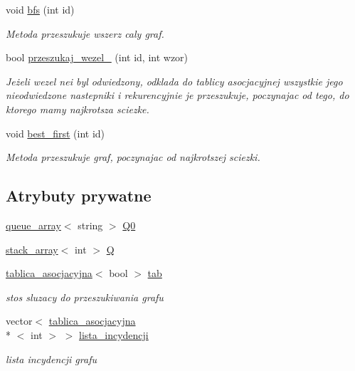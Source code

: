 \begin{DoxyCompactItemize}
void \hyperlink{classgraf_a51bb320791ada3c7700fa90477b508f4}{bfs} (int id)
\begin{DoxyCompactList}\small\item\em Metoda przeszukuje wszerz caly graf. \end{DoxyCompactList}\item 
bool \hyperlink{classgraf_abf0a6bb0cfd8ef55868981bb91881de3}{przeszukaj\-\_\-wezel\-\_} (int id, int wzor)
\begin{DoxyCompactList}\small\item\em Jeżeli wezel nei byl odwiedzony, odklada do tablicy asocjacyjnej wszystkie jego nieodwiedzone nastepniki i rekurencyjnie je przeszukuje, poczynajac od tego, do ktorego mamy najkrotsza sciezke. \end{DoxyCompactList}\item 
void \hyperlink{classgraf_ac7c83abd9cf9ee4d3d9dfb1fdbf157a1}{best\-\_\-first} (int id)
\begin{DoxyCompactList}\small\item\em Metoda przeszukuje graf, poczynajac od najkrotszej sciezki. \end{DoxyCompactList}\end{DoxyCompactItemize}
\subsection*{Atrybuty prywatne}
\begin{DoxyCompactItemize}
\item 
\hyperlink{classqueue__array}{queue\-\_\-array}$<$ string $>$ \hyperlink{classgraf_a8dfe6c329285c5077e2d612247b0a8b0}{Q0}
\item 
\hyperlink{classstack__array}{stack\-\_\-array}$<$ int $>$ \hyperlink{classgraf_a9d7d7f9781f344e37cc41ef26e0f690a}{Q}
\item 
\hyperlink{classtablica__asocjacyjna}{tablica\-\_\-asocjacyjna}$<$ bool $>$ \hyperlink{classgraf_a563284d00331e414f9d124da73e43dd6}{tab}
\begin{DoxyCompactList}\small\item\em stos sluzacy do przeszukiwania grafu \end{DoxyCompactList}\item 
vector$<$ \hyperlink{classtablica__asocjacyjna}{tablica\-\_\-asocjacyjna}\\*
$<$ int $>$ $>$ \hyperlink{classgraf_a867b5d2b59608ad67207f4537214e006}{lista\-\_\-incydencji}
\begin{DoxyCompactList}\small\item\em lista incydencji grafu \end{DoxyCompactList}\end{DoxyCompactItemize}


